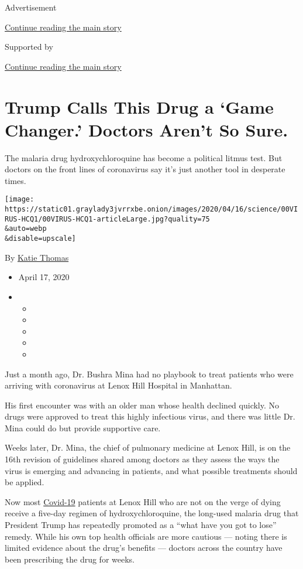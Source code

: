 Advertisement

\protect\hyperlink{after-top}{Continue reading the main story}

Supported by

\protect\hyperlink{after-sponsor}{Continue reading the main story}

\hypertarget{trump-calls-this-drug-a-game-changer-doctors-arent-so-sure}{%
\section{Trump Calls This Drug a `Game Changer.' Doctors Aren't So
Sure.}\label{trump-calls-this-drug-a-game-changer-doctors-arent-so-sure}}

The malaria drug hydroxychloroquine has become a political litmus test.
But doctors on the front lines of coronavirus say it's just another tool
in desperate times.

\texttt{[image: https://static01.graylady3jvrrxbe.onion/images/2020/04/16/science/00VIRUS-HCQ1/00VIRUS-HCQ1-articleLarge.jpg?quality=75\\\&auto=webp\\\&disable=upscale]}

By \href{https://www.nytimes3xbfgragh.onion/by/katie-thomas}{Katie
Thomas}

\begin{itemize}
\item
  April 17, 2020
\item
  \begin{itemize}
  \item
  \item
  \item
  \item
  \item
  \end{itemize}
\end{itemize}

Just a month ago, Dr. Bushra Mina had no playbook to treat patients who
were arriving with coronavirus at Lenox Hill Hospital in Manhattan.

His first encounter was with an older man whose health declined quickly.
No drugs were approved to treat this highly infectious virus, and there
was little Dr. Mina could do but provide supportive care.

Weeks later, Dr. Mina, the chief of pulmonary medicine at Lenox Hill, is
on the 16th revision of guidelines shared among doctors as they assess
the ways the virus is emerging and advancing in patients, and what
possible treatments should be applied.

Now most
\href{https://www.nytimes3xbfgragh.onion/news-event/coronavirus?action=click\&pgtype=Article\&state=default\&module=STYLN_coronahub\&variant=show\&region=header\&context=menu}{Covid-19}
patients at Lenox Hill who are not on the verge of dying receive a
five-day regimen of hydroxychloroquine, the long-used malaria drug that
President Trump has repeatedly promoted as a ``what have you got to
lose'' remedy. While his own top health officials are more cautious ---
noting there is limited evidence about the drug's benefits --- doctors
across the country have been prescribing the drug for weeks.

